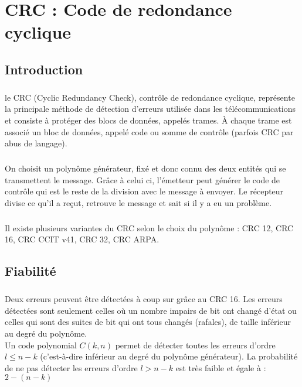 
\chapter{CRC : Code de redondance cyclique}

    \section{Introduction}

        \paragraph{}
le CRC (Cyclic Redundancy Check), contrôle de redondance cyclique,
représente la principale méthode de détection d'erreurs utilisée dans les télécommunications et
consiste à protéger des blocs de données, appelés trames.
À chaque trame est associé un bloc de données, appelé code ou somme de contrôle (parfois CRC par abus de langage).
        \paragraph{}
On choisit un polynôme générateur, fixé et donc connu des deux entités qui se transmettent le message.
Grâce à celui ci, l'émetteur peut générer le code de contrôle qui est le reste de la division avec le message à envoyer.
Le récepteur divise ce qu'il a reçut, retrouve le message et sait si il y a eu un problème.
        \paragraph{}
Il existe plusieurs variantes du CRC selon le choix du polynôme : CRC 12, CRC 16, CRC CCIT v41, CRC 32, CRC ARPA.


    \clearpage

    \section{Fiabilité}

        \paragraph{}
Deux erreurs peuvent être détectées à coup sur grâce au CRC 16.
Les erreurs détectées sont seulement celles où un nombre impairs de bit ont changé d'état ou
celles qui sont des suites de bit qui ont tous changés (rafales), de taille inférieur au
degré du polynôme.
\\Un code polynomial $C(k, n)$ permet de détecter toutes les
erreurs d’ordre $l \leq n-k$ (c’est-à-dire inférieur au degré du
polynôme générateur).
La probabilité de ne pas détecter les erreurs d’ordre $l>n-k$ est
très faible et égale à : $2-(n-k)$


